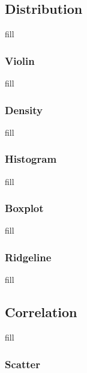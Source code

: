 \documentclass[
  b5paper]{book}
\begin{document}
\hypertarget{distribution}{%
\subsection*{Distribution}\label{distribution}}

fill

\hypertarget{violin}{%
\subsubsection*{Violin}\label{violin}}

fill

\hypertarget{density}{%
\subsubsection*{Density}\label{density}}

fill

\hypertarget{histogram}{%
\subsubsection*{Histogram}\label{histogram}}

fill

\hypertarget{boxplot}{%
\subsubsection*{Boxplot}\label{boxplot}}

fill

\hypertarget{ridgeline}{%
\subsubsection*{Ridgeline}\label{ridgeline}}

fill

\hypertarget{correlation}{%
\subsection*{Correlation}\label{correlation}}

fill

\hypertarget{scatter}{%
\subsubsection*{Scatter}\label{scatter}}
\end{document}

